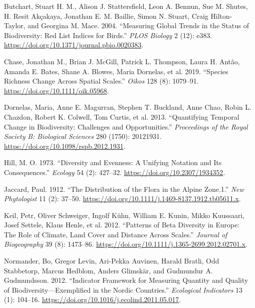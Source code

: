 \documentclass[
  12pt,
  oneside]{report}
\begin{document}
\leavevmode\hypertarget{ref-butchart_measuring_2004}{}%
Butchart, Stuart H. M., Alison J. Stattersfield, Leon A. Bennun, Sue M. Shutes, H. Resit Akçakaya, Jonathan E. M. Baillie, Simon N. Stuart, Craig Hilton-Taylor, and Georgina M. Mace. 2004. ``Measuring Global Trends in the Status of Biodiversity: Red List Indices for Birds.'' \emph{PLOS Biology} 2 (12): e383. \url{https://doi.org/10.1371/journal.pbio.0020383}.

\leavevmode\hypertarget{ref-chase_species_2019}{}%
Chase, Jonathan M., Brian J. McGill, Patrick L. Thompson, Laura H. Antão, Amanda E. Bates, Shane A. Blowes, Maria Dornelas, et al. 2019. ``Species Richness Change Across Spatial Scales.'' \emph{Oikos} 128 (8): 1079--91. \url{https://doi.org/10.1111/oik.05968}.

\leavevmode\hypertarget{ref-dornelas_quantifying_2013}{}%
Dornelas, Maria, Anne E. Magurran, Stephen T. Buckland, Anne Chao, Robin L. Chazdon, Robert K. Colwell, Tom Curtis, et al. 2013. ``Quantifying Temporal Change in Biodiversity: Challenges and Opportunities.'' \emph{Proceedings of the Royal Society B: Biological Sciences} 280 (1750): 20121931. \url{https://doi.org/10.1098/rspb.2012.1931}.

\leavevmode\hypertarget{ref-hill_diversity_1973}{}%
Hill, M. O. 1973. ``Diversity and Evenness: A Unifying Notation and Its Consequences.'' \emph{Ecology} 54 (2): 427--32. \url{https://doi.org/10.2307/1934352}.

\leavevmode\hypertarget{ref-jaccard_distribution_1912}{}%
Jaccard, Paul. 1912. ``The Distribution of the Flora in the Alpine Zone.1.'' \emph{New Phytologist} 11 (2): 37--50. \url{https://doi.org/10.1111/j.1469-8137.1912.tb05611.x}.

\leavevmode\hypertarget{ref-keil_patterns_2012}{}%
Keil, Petr, Oliver Schweiger, Ingolf Kühn, William E. Kunin, Mikko Kuussaari, Josef Settele, Klaus Henle, et al. 2012. ``Patterns of Beta Diversity in Europe: The Role of Climate, Land Cover and Distance Across Scales.'' \emph{Journal of Biogeography} 39 (8): 1473--86. \url{https://doi.org/10.1111/j.1365-2699.2012.02701.x}.

\leavevmode\hypertarget{ref-normander_indicator_2012}{}%
Normander, Bo, Gregor Levin, Ari-Pekka Auvinen, Harald Bratli, Odd Stabbetorp, Marcus Hedblom, Anders Glimskär, and Gudmundur A. Gudmundsson. 2012. ``Indicator Framework for Measuring Quantity and Quality of Biodiversity---Exemplified in the Nordic Countries.'' \emph{Ecological Indicators} 13 (1): 104--16. \url{https://doi.org/10.1016/j.ecolind.2011.05.017}.
\end{document}
